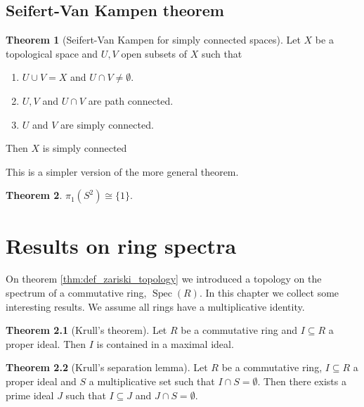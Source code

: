 \documentclass[a4paper]{book}
\theoremstyle{definition}
\newtheorem{theorem}{Theorem}[section]
\theoremstyle{ejemplo}
\theoremstyle{demostracion}
\DeclareMathOperator{\spec}{Spec}
\begin{document}
\section{Seifert-Van Kampen theorem}
\begin{theorem}[Seifert-Van Kampen for simply connected spaces]
	Let $X$ be a topological space and $U,V$ open subsets of $X$ such that
	\begin{enumerate}
		\item
		$U \cup V = X$ and $U \cap V \neq \emptyset$.
		\item
		$U, V$ and $U \cap V$ are path connected.
		\item
		$U$ and $V$ are simply connected.
	\end{enumerate}
	Then $X$ is simply connected
\end{theorem}
This is a simpler version of the more general theorem.
\begin{theorem}
	$\pi_1(S^2) \cong \{1\}$.
\end{theorem}


\chapter{Results on ring spectra}
On theorem \eqref{thm:def_zariski_topology} we introduced a topology on the spectrum of a commutative ring, $\spec(R)$. In this chapter we collect some interesting results. We assume all rings have a multiplicative identity.

\begin{theorem}[Krull's theorem]
	Let $R$ be a commutative ring and $I \subseteq R$ a proper ideal. Then $I$ is contained in a maximal ideal.
\end{theorem}

\begin{theorem}[Krull's separation lemma]
	Let $R$ be a commutative ring, $I \subseteq R$ a proper ideal and $S$ a multiplicative set such that $I \cap S = \emptyset$. Then there exists a prime ideal $J$ such that $I \subseteq J$ and $J \cap S = \emptyset$.
\end{theorem}
\end{document}
